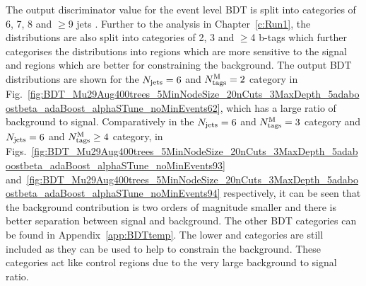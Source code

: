 The output discriminator value for the event level BDT is split into \njets categories of 6, 7, 8 and $\geq$9 jets . Further to the \runone analysis in Chapter~\ref{c:Run1}, the distributions are also split into \nMtags categories of 2, 3 and $\geq$4 b-tags which further categorises the distributions into regions which are more sensitive to the signal and regions which are better for constraining the background.
The output BDT distributions are shown for the $N_{\textrm{jets}}=6$ and $N_{\textrm{tags}}^{\textrm{M}}=2$ category in Fig.~\ref{fig:BDT_Mu29Aug400trees_5MinNodeSize_20nCuts_3MaxDepth_5adaboostbeta_adaBoost_alphaSTune_noMinEvents62}, which has a large ratio of background to signal. Comparatively in the $N_{\textrm{jets}}=6$ and $N_{\textrm{tags}}^{\textrm{M}}=3$ category and $N_{\textrm{jets}}=6$ and $N_{\textrm{tags}}^{\textrm{M}}\geq4$ category, in Figs.~\ref{fig:BDT_Mu29Aug400trees_5MinNodeSize_20nCuts_3MaxDepth_5adaboostbeta_adaBoost_alphaSTune_noMinEvents93} and~\ref{fig:BDT_Mu29Aug400trees_5MinNodeSize_20nCuts_3MaxDepth_5adaboostbeta_adaBoost_alphaSTune_noMinEvents94} respectively, it can be seen that the background contribution is two orders of magnitude smaller and there is better separation between signal and background. The other BDT categories can be found in Appendix~\ref{app:BDTtemp}.
The lower \njets and \nMtags categories are still included as they can be used to help to constrain the \ttbar background. These categories act like control regions due to the very large background to signal ratio. 

